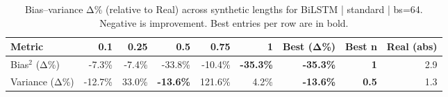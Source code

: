 \renewcommand{\arraystretch}{1.2}
\begin{table}[!t]
\centering
\footnotesize
\caption{Bias–variance Δ\% (relative to Real) across synthetic lengths for BiLSTM | standard | bs=64. Negative is improvement. Best entries per row are in bold.}
\label{tab:bvdelta_BiLSTM_standard_bs64}
\setlength{\tabcolsep}{5pt}
\begin{tabular}{lrrrrrrrr}
\toprule
Metric & 0.1 & 0.25 & 0.5 & 0.75 & 1 & Best (Δ\%) & Best n & Real (abs) \\
\midrule
Bias$^2$ (Δ\%) & -7.3\% & -7.4\% & -33.8\% & -10.4\% & \textbf{-35.3\%} & \textbf{-35.3\%} & \textbf{1} & 2.9 \\
Variance (Δ\%) & -12.7\% & 33.0\% & \textbf{-13.6\%} & 121.6\% & 4.2\% & \textbf{-13.6\%} & \textbf{0.5} & 1.3 \\
\bottomrule
\end{tabular}

\end{table}
